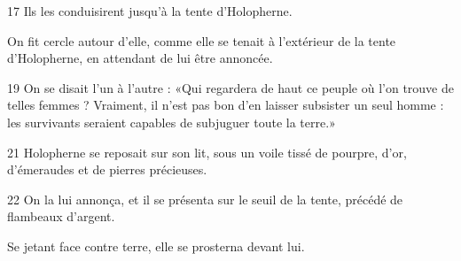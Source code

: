 

17 Ils les conduisirent jusqu'à la tente d'Holopherne.

On fit cercle autour d'elle, comme elle se tenait à l'extérieur de la tente d'Holopherne, en attendant de lui être annoncée.

19 On se disait l'un à l'autre : «Qui regardera de haut ce peuple où l'on trouve de telles femmes ? Vraiment, il n'est pas bon d'en laisser subsister un seul homme : les survivants seraient capables de subjuguer toute la terre.»

21 Holopherne se reposait sur son lit, sous un voile tissé de pourpre, d'or, d'émeraudes et de pierres précieuses.

22 On la lui annonça, et il se présenta sur le seuil de la tente, précédé de flambeaux d'argent.

Se jetant face contre terre, elle se prosterna devant lui.